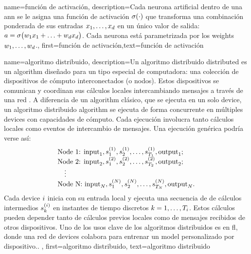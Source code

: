 {name={función de activación},
	description={Cada neurona artificial dentro de una \gls{ann} se le asigna 
		una función de activación $\sigma(\cdot)$ que transforma una combinación ponderada de 
		sus entradas $x_{1},\ldots,x_{d}$ en un único valor de salida: 
		$a = \sigma\big(w_{1} x_{1}+\ldots+w_{d} x_{d} \big)$. 
		Cada neurona está parametrizada por los \gls{weights} $w_{1},\ldots,w_{d}$.},
first={función de activación},text={función de activación} 
}

{name={algoritmo distribuido},
	description={Un algoritmo distribuido distributed es un \gls{algorithm} diseñado para 
		un tipo especial de computadora: una colección de dispositivos de cómputo interconectados (o nodos). 
		Estos dispositivos se comunican y coordinan sus cálculos locales intercambiando mensajes
		a través de una red \cite{IntroDistAlg,ParallelDistrBook}. A diferencia de un \gls{algorithm} clásico,
		que se ejecuta en un solo \gls{device}, un algoritmo distribuido \gls{algorithm}  
		se ejecuta de forma concurrente en múltiples \gls{device}s con capacidades de cómputo. 
		Cada ejecución involucra tanto cálculos locales como eventos de intercambio de mensajes. 
		Una ejecución genérica podría verse así: 
		\[
		\begin{array}{l}
			\text{Node 1: } {\rm input}_1, s_1^{(1)}, s_2^{(1)}, \ldots, s_{T_1}^{(1)}, {\rm output}_1; \\
			\text{Node 2: } {\rm input}_2, s_1^{(2)}, s_2^{(2)}, \ldots, s_{T_2}^{(2)}, {\rm output}_2; \\
			\quad \vdots \\
			\text{Node N: } {\rm input}_N, s_1^{(N)}, s_2^{(N)}, \ldots, s_{T_N}^{(N)}, {\rm output}_N.
		\end{array}
		\]
		Cada \gls{device} $i$ inicia con su entrada local y ejecuta una secuencia de 
		de cálculos intermedios $s_{k}^{(i)}$ en instantes de tiempo discretos $k = 1, \dots, T_i$. 
		Estos cálculos pueden depender tanto de cálculos previos locales como de mensajes recibidos de otros dispositivos.
		Uno de los usos clave de los algoritmos distribuidos es en \gls{fl}, donde una red de 
		\gls{device}s colabora para entrenar un \gls{model} personalizado por dispositivo.. 
		},
	first={algoritmo distribuido}, text={algoritmo distribuido}
}



